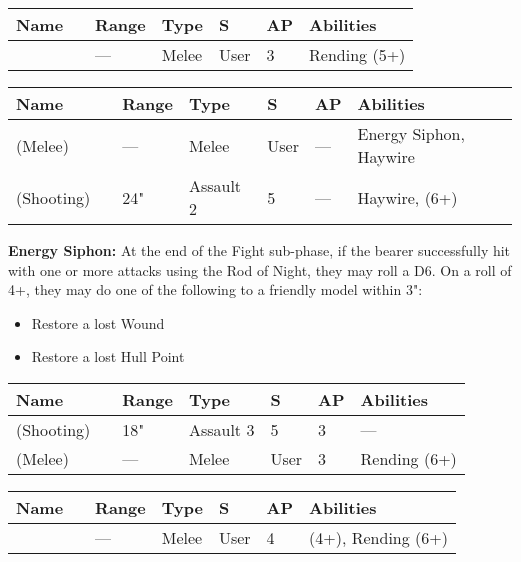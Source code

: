 
 \label{Melee Weapons}

 \label{Hyperphase Sword}
\noindent
\begin{tabular}{||m{110pt} m{30pt} m{31pt} m{55pt} m{12pt} m{12pt} m{210pt}||}
	\hline
	Name & & Range & Type & S & AP & Abilities \\
	\hline
	\quickref{Hyperphase Sword} &  & — & Melee & User & 3 & Rending (5+) \\
	\hline
\end{tabular}

 \label{Rod of Night}
\noindent
\begin{tabular}{||m{110pt} m{30pt} m{31pt} m{55pt} m{12pt} m{12pt} m{210pt}||}
	\hline
	Name & & Range & Type & S & AP & Abilities \\
	\hline
	\quickref{Rod of Night} (Melee) & & — & Melee & User & — & Energy Siphon, Haywire \\
	\quickref{Rod of Night} (Shooting) & & 24" & Assault 2 & 5 & — & Haywire, \quickref{Tesla} (6+) \\
	\hline
\end{tabular}
\label{Energy Siphon}
\textbf{Energy Siphon:} At the end of the Fight sub-phase, if the bearer successfully hit with one or more attacks using the Rod of Night, they may roll a D6. On a roll of 4+, they may do one of the following to a friendly model within 3":
\begin{itemize}
	\item Restore a lost Wound
	\item Restore a lost Hull Point
\end{itemize}
	

 \label{Staff of Light}
\noindent
\begin{tabular}{||m{110pt} m{30pt} m{31pt} m{55pt} m{12pt} m{12pt} m{210pt}||}
	\hline
	Name & & Range & Type & S & AP & Abilities \\
	\hline
	\quickref{Staff of Light} (Shooting) & & 18" & Assault 3 & 5 & 3 & — \\
	\quickref{Staff of Light} (Melee) & & — & Melee & User & 3 & Rending (6+) \\
	\hline
\end{tabular}

 \label{Voidblade}
\noindent
\begin{tabular}{||m{110pt} m{30pt} m{31pt} m{55pt} m{12pt} m{12pt} m{210pt}||}
	\hline
	Name & & Range & Type & S & AP & Abilities \\
	\hline
	\quickref{Voidblade} &  & — & Melee & User & 4 & \quickref{Entropic Strike} (4+), Rending (6+) \\
	\hline
\end{tabular}

